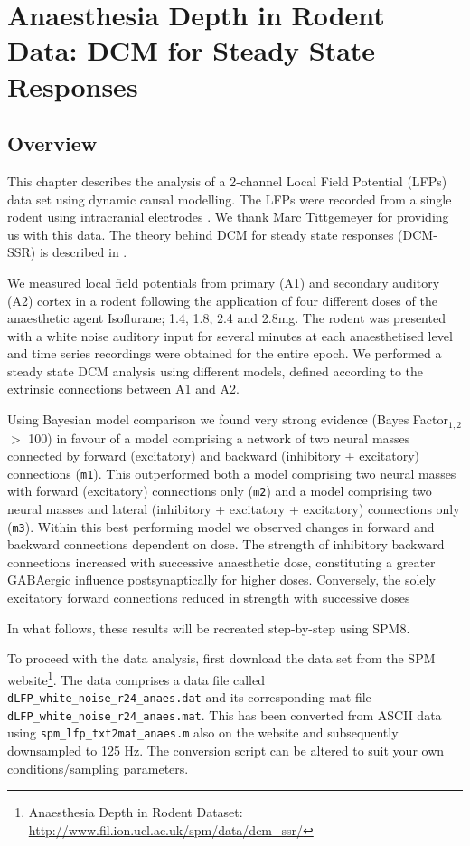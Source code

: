 \chapter{Anaesthesia Depth in Rodent Data: DCM for Steady State Responses \label{chapter:data:dcm_ssr}}

\section{Overview}

This chapter describes the analysis of a 2-channel Local Field Potential (LFPs) data set using dynamic causal modelling. The LFPs were recorded from a single rodent using intracranial electrodes \cite{dcm_ssr_anaesthesia}. We thank Marc Tittgemeyer for providing us with this data. The theory behind DCM for steady state responses (DCM-SSR) is described in \cite{dcm_ssr}.

We measured local field potentials from primary (A1) and secondary auditory (A2) cortex in a rodent following the application of four different doses of the anaesthetic agent Isoflurane; 1.4, 1.8, 2.4 and 2.8mg. The rodent was presented with a white noise auditory input for several minutes at each anaesthetised level and time series recordings were obtained for the entire epoch. We performed a steady state DCM analysis using different models, defined according to the extrinsic connections between A1 and A2.

Using Bayesian model comparison we found very strong evidence (Bayes Factor$_{1,2}$ $>$ 100) in favour of a model comprising a network of two neural masses connected by forward (excitatory) and backward (inhibitory + excitatory) connections (\texttt{m1}). This outperformed both a model comprising two neural masses with forward (excitatory) connections only (\texttt{m2}) and a model comprising two neural masses and lateral (inhibitory + excitatory + excitatory) connections only (\texttt{m3}). Within this best performing model we observed changes in forward and backward connections dependent on dose. The strength of inhibitory backward connections increased with successive anaesthetic dose, constituting a greater GABAergic influence postsynaptically for higher doses. Conversely, the solely excitatory forward connections reduced in strength with successive doses

In what follows, these results will be recreated step-by-step using SPM8.

To proceed with the data analysis, first download the data set from the SPM website\footnote{Anaesthesia Depth in Rodent Dataset: \url{http://www.fil.ion.ucl.ac.uk/spm/data/dcm_ssr/}}. The data comprises a data file called \texttt{dLFP\_white\_noise\_r24\_anaes.dat} and its corresponding mat file \texttt{dLFP\_white\_noise\_r24\_anaes.mat}. This has been converted from ASCII data using \texttt{spm\_lfp\_txt2mat\_anaes.m} also on the website and subsequently downsampled to 125 Hz. The conversion script can be altered to suit your own conditions/sampling parameters.


